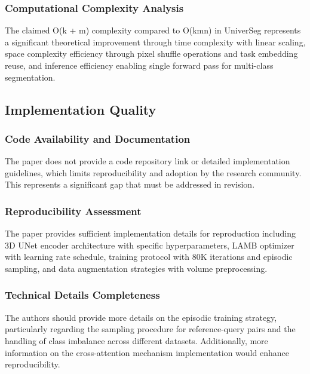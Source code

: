 \subsubsection{Computational Complexity Analysis}
The claimed O(k + m) complexity compared to O(kmn) in UniverSeg represents a significant theoretical improvement through time complexity with linear scaling, space complexity efficiency through pixel shuffle operations and task embedding reuse, and inference efficiency enabling single forward pass for multi-class segmentation.

\subsection{Implementation Quality}
\subsubsection{Code Availability and Documentation}
The paper does not provide a code repository link or detailed implementation guidelines, which limits reproducibility and adoption by the research community. This represents a significant gap that must be addressed in revision.

\subsubsection{Reproducibility Assessment}
The paper provides sufficient implementation details for reproduction including 3D UNet encoder architecture with specific hyperparameters, LAMB optimizer with learning rate schedule, training protocol with 80K iterations and episodic sampling, and data augmentation strategies with volume preprocessing.

\subsubsection{Technical Details Completeness}
The authors should provide more details on the episodic training strategy, particularly regarding the sampling procedure for reference-query pairs and the handling of class imbalance across different datasets. Additionally, more information on the cross-attention mechanism implementation would enhance reproducibility.
